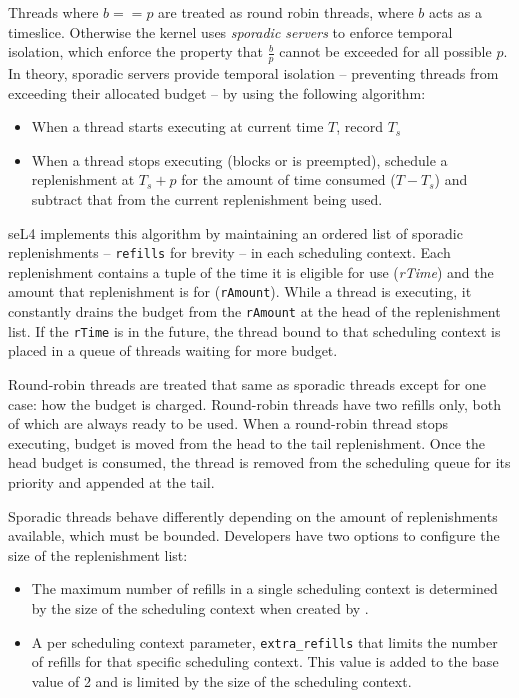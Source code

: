 Threads where $b == p$ are treated as round robin threads, where $b$ acts as a timeslice.
Otherwise the kernel uses \emph{sporadic servers} to enforce temporal isolation, which enforce the
property that $\frac{b}{p}$ cannot be exceeded for all possible $p$.
In theory, sporadic servers provide temporal isolation -- preventing threads from exceeding their allocated budget -- by using the following algorithm:

\begin{itemize}
\item When a thread starts executing at current time $T$, record $T_{s}$
\item When a thread stops executing (blocks or is preempted), schedule a replenishment at $T_{s} + p$ for the
amount of time consumed ($T - T_{s}$) and subtract that from the current replenishment being used.
\end{itemize}

seL4 implements this algorithm by maintaining an ordered list of sporadic replenishments --
\texttt{refills} for brevity -- in each scheduling context. Each replenishment contains a tuple
of the time it is eligible for use (\emph{rTime}) and the amount that replenishment is for
(\texttt{rAmount}).
While a thread is executing, it constantly drains the budget from the \texttt{rAmount} at the head of the
replenishment list. If the \texttt{rTime} is in the future, the thread bound to that
scheduling context is placed in a queue of threads waiting for more budget.

Round-robin threads are treated that same as sporadic threads except for one case: how the
budget is charged. Round-robin threads have two refills only, both of which are always ready to be
used. When a round-robin thread stops executing, budget is moved from the head to the tail
replenishment. Once the head budget is consumed, the thread is removed from the scheduling queue
for its priority and appended at the tail.

Sporadic threads behave differently depending on the amount of replenishments available, which
must be bounded. Developers have two options to configure the size of the replenishment list:

\begin{itemize}
\item The maximum number of refills in a single scheduling context is determined by the size
      of the scheduling context when created by .
\item A per scheduling context parameter, \texttt{extra\_refills} that
limits the number of refills for that specific scheduling context. This value is added to the base
value of 2 and is limited by the size of the scheduling context.
\end{itemize}

